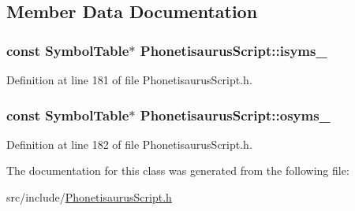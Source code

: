 \subsection{Member Data Documentation}
\subsubsection[{isyms\+\_\+}]{\setlength{\rightskip}{0pt plus 5cm}const Symbol\+Table$\ast$ Phonetisaurus\+Script\+::isyms\+\_\+}\hypertarget{class_phonetisaurus_script_a892a638e7981500caad3a318a25bac32}{}\label{class_phonetisaurus_script_a892a638e7981500caad3a318a25bac32}


Definition at line 181 of file Phonetisaurus\+Script.\+h.

\subsubsection[{osyms\+\_\+}]{\setlength{\rightskip}{0pt plus 5cm}const Symbol\+Table$\ast$ Phonetisaurus\+Script\+::osyms\+\_\+}\hypertarget{class_phonetisaurus_script_a1f9565aaef49b7c312c3eacc7b3d97ac}{}\label{class_phonetisaurus_script_a1f9565aaef49b7c312c3eacc7b3d97ac}


Definition at line 182 of file Phonetisaurus\+Script.\+h.



The documentation for this class was generated from the following file\+:\begin{DoxyCompactItemize}
\item 
src/include/\hyperlink{_phonetisaurus_script_8h}{Phonetisaurus\+Script.\+h}\end{DoxyCompactItemize}
